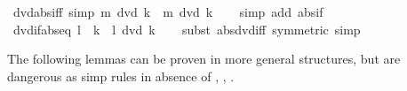 \begin{isabellebody}
\endisatagproof
{\isafoldproof}%
%
\isadelimproof
\isanewline
%
\endisadelimproof
\isanewline
{}\isamarkupfalse%
\ dvd{\isacharunderscore}{\kern0pt}abs{\isacharunderscore}{\kern0pt}iff\ {\isacharbrackleft}{\kern0pt}simp{\isacharbrackright}{\kern0pt}{\isacharcolon}{\kern0pt}\ {\isachardoublequoteopen}m\ dvd\ {\isasymbar}k{\isasymbar}\ {\isasymlongleftrightarrow}\ m\ dvd\ k{\isachardoublequoteclose}\isanewline
%
\isadelimproof
\ \ %
\endisadelimproof
%
\isatagproof
{}\isamarkupfalse%
\ {\isacharparenleft}{\kern0pt}simp\ add{\isacharcolon}{\kern0pt}\ abs{\isacharunderscore}{\kern0pt}if{\isacharparenright}{\kern0pt}%
\endisatagproof
{\isafoldproof}%
%
\isadelimproof
\isanewline
%
\endisadelimproof
\isanewline
{}\isamarkupfalse%
\ dvd{\isacharunderscore}{\kern0pt}if{\isacharunderscore}{\kern0pt}abs{\isacharunderscore}{\kern0pt}eq{\isacharcolon}{\kern0pt}\ {\isachardoublequoteopen}{\isasymbar}l{\isasymbar}\ {\isacharequal}{\kern0pt}\ {\isasymbar}k{\isasymbar}\ {\isasymLongrightarrow}\ l\ dvd\ k{\isachardoublequoteclose}\isanewline
%
\isadelimproof
\ \ %
\endisadelimproof
%
\isatagproof
{}\isamarkupfalse%
\ {\isacharparenleft}{\kern0pt}subst\ abs{\isacharunderscore}{\kern0pt}dvd{\isacharunderscore}{\kern0pt}iff\ {\isacharbrackleft}{\kern0pt}symmetric{\isacharbrackright}{\kern0pt}{\isacharparenright}{\kern0pt}\ simp%
\endisatagproof
{\isafoldproof}%
%
\isadelimproof
%
\endisadelimproof
%
\begin{isamarkuptext}%
The following lemmas can be proven in more general structures, but
  are dangerous as simp rules in absence of ,
  , .%

\end{isamarkuptext}
\end{isabellebody}

